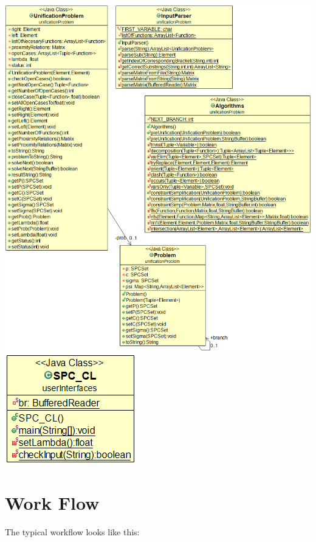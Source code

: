 \documentclass{article}
\begin{document}
\newpage
\includegraphics[scale=0.5]{UnificationProblemModel}
\newpage
\includegraphics[scale=0.5]{UIModel}


\section{Work Flow}
The typical workflow looks like this:

%
\end{document}

